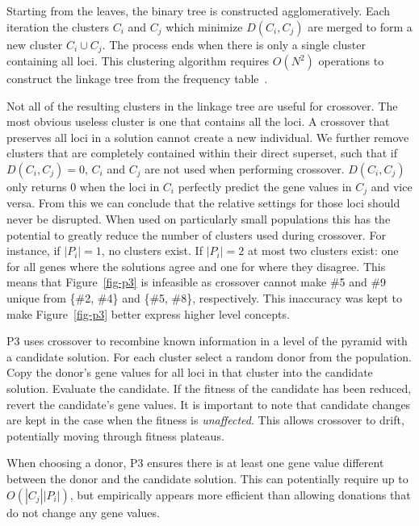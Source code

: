 \documentclass{sig-alternate}
\begin{document}
Starting from the leaves, the binary tree is constructed agglomeratively. Each
iteration the clusters $C_i$ and $C_j$ which minimize $D(C_i, C_j)$ are
merged to form a new cluster $C_i \cup C_j$.
The process ends when there is only a single cluster
containing all loci.  This clustering algorithm
requires $O(N^2)$ operations to construct the linkage tree
from the frequency table~\cite{gronau:2007:upgma}.

Not all of  the resulting clusters in the linkage  tree are useful for
crossover.  The most obvious useless  cluster is one that contains all
the loci.   A crossover that preserves  all loci in  a solution cannot
create  a  new  individual.   We  further  remove  clusters  that  are
completely  contained   within their direct superset,   such  that  if
$D(C_i,C_j) = 0$, $C_i$  and  $C_j$ are  not used  when  performing
crossover.   $D(C_i,C_j)$ only  returns  $0$ when  the  loci in  $C_i$
perfectly predict the gene values in $C_j$ and vice versa. From this we can
conclude  that  the relative settings  for  those  loci  should  never  be
disrupted.  When  used on particularly small populations  this has the
potential  to  greatly  reduce  the  number of  clusters  used  during
crossover.  For  instance, if  $|P_i| = 1$,  no clusters exist. If
$|P_i| =  2$ at most two clusters  exist: one for all  genes where the
solutions agree and one for where they disagree.
This means that Figure~\ref{fig-p3} is infeasible as crossover
cannot make \#5 and \#9 unique from \{\#2, \#4\} and \{\#5, \#8\}, respectively.
This inaccuracy was kept to make Figure~\ref{fig-p3} better express
higher level concepts.

P3 uses crossover to recombine known information in a level of the
pyramid with a candidate solution.  For
each cluster select a random donor from the population.  Copy the
donor's gene values for all loci in that cluster into the candidate
solution.  Evaluate the candidate.  If the fitness of the candidate
has been reduced, revert the candidate's gene values.  It is important
to note that candidate changes are kept in the case when the fitness
is \emph{unaffected}.  This allows crossover to drift, potentially
moving through fitness plateaus.

When choosing a donor, P3 ensures there is at least one gene value
different between the donor and the candidate solution.  This can
potentially require up to $O(|C_j||P_i|)$, but empirically appears
more efficient than allowing donations that do not change any gene
values.
\end{document}
